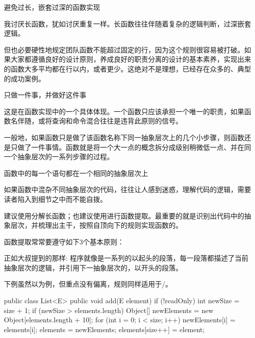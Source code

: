 \begin{content}

\begin{regulation}
避免过长，嵌套过深的函数实现
\end{regulation}

我讨厌长函数，犹如讨厌重复一样。长函数往往伴随着复杂的逻辑判断，过深嵌套逻辑。

但也必要硬性地规定团队函数不能超过固定的行，因为这个规则很容易被打破。如果大家都遵循良好的设计原则，养成良好的职责分离的设计的基本素养，实现出来的函数大多平均都在行以内，或者更少。这绝对不是理想，已经存在众多的、典型的成功案例。

\begin{regulation}
只做一件事，并做好这件事
\end{regulation}

这是在函数实现中的一个具体体现。一个函数只应该承担一个唯一的职责，如果函数名伴随，或将查询和命令混合往往是违背此原则的信号。

一般地，如果函数只是做了该函数名称下同一抽象层次上的几个小步骤，则函数还是只做了一件事情。函数就是将一个大一点的概念拆分成级别稍微低一点、并在同一个抽象层次的一系列步骤的过程。

\begin{regulation}
函数中的每一个语句都在一个相同的抽象层次上
\end{regulation}

如果函数中混杂不同抽象层次的代码，往往让人感到迷惑，理解代码的逻辑，需要读者陷入到细节之中而不能自拨。

建议使用分解长函数；也建议使用进行函数提取。最重要的就是识别出代码中的抽象层次，并梳理出主干，按照自顶向下的规则实现函数的。

函数提取常常要遵守如下3个基本原则：
\begin{enum}
\end{enum}

正如大叔提到的那样: 程序就像是一系列的以起头的段落，每一段落都描述了当前抽象层次的逻辑，并引用下一抽象层次的，以开头的段落。

下例虽然以为例，但重点没有偏离，规则同样适用于\clang{}/\cpp{}。

\begin{leftbar}
\begin{java}[caption={java.util.List}]
public class List<E> {
   public void add(E element) {
      if (!readOnly) {
         int newSize = size + 1;
         if (newSize > elements.length) {
            Object[] newElements =
               new Object[elements.length + 10];
            for (int i = 0; i < size; i++)
               newElements[i] = elements[i];
            elements = newElements;
         }
         elements[size++] = element;
      }
   }
}
\end{java}
\end{leftbar}


\end{content}
